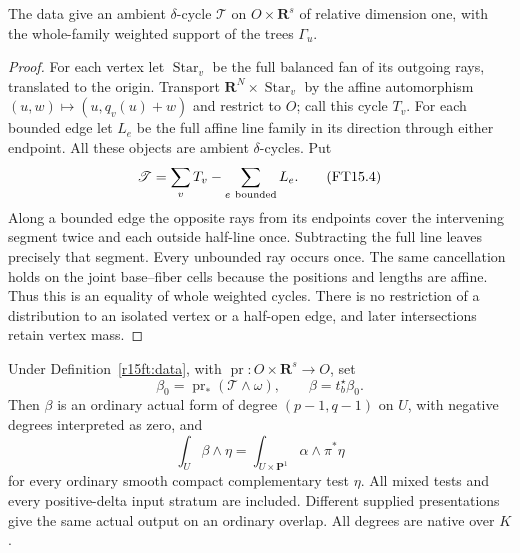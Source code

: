 \begin{lemma}
\label{r15ft:family}
The data give an ambient $\delta$-cycle $\mathscr T$ on
$O\times\mathbf R^s$ of relative dimension one, with the
whole-family weighted support of the trees $\Gamma_u$.
\end{lemma}

\begin{proof}
For each vertex let $\operatorname{Star}_v$ be the full balanced
fan of its outgoing rays, translated to the origin. Transport
$\mathbf R^N\times\operatorname{Star}_v$ by the affine
automorphism $(u,w)\mapsto(u,q_v(u)+w)$ and restrict to $O$;
call this cycle $T_v$. For each bounded edge let $L_e$ be the
full affine line family in its direction through either endpoint.
All these objects are ambient $\delta$-cycles. Put
\[
                   \mathscr T=\sum_vT_v-\sum_{e\ {\rm bounded}}L_e.
\tag{FT15.4}\label{r15ft:star-line}
\]
Along a bounded edge the opposite rays from its endpoints cover
the intervening segment twice and each outside half-line once.
Subtracting the full line leaves precisely that segment. Every
unbounded ray occurs once. The same cancellation holds on the
joint base--fiber cells because the positions and lengths are
affine. Thus this is an equality of whole weighted cycles.
There is no restriction of a distribution to an isolated vertex
or a half-open edge, and later intersections retain vertex mass.
\end{proof}

\begin{theorem}
\label{r15ft:projection}
Under Definition~\ref{r15ft:data}, with
$\operatorname{pr}:O\times\mathbf R^s\to O$, set
\[
 \beta_0=\operatorname{pr}_*(\mathscr T\wedge\omega),
       \qquad\beta=t_b^\star\beta_0.
\tag{FT15.5}\label{r15ft:output}
\]
Then $\beta$ is an ordinary actual form of degree $(p-1,q-1)$
on $U$, with negative degrees interpreted as zero, and
\[
 \int_U\beta\wedge\eta
       =\int_{U\times\mathbf P^1}\alpha\wedge\pi^*\eta
\tag{FT15.6}\label{r15ft:comparison}
\]
for every ordinary smooth compact complementary test $\eta$.
All mixed tests and every positive-delta input stratum are
included. Different supplied presentations give the same actual
output on an ordinary overlap. All degrees are native over $K$.
\end{theorem}

